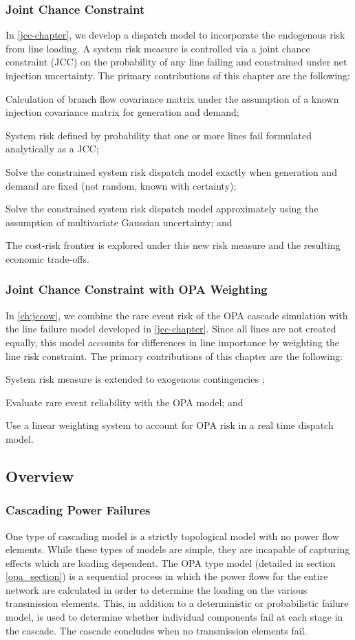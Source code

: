\subsubsection{Joint Chance Constraint}
In \cref{jcc-chapter}, we develop a dispatch model to incorporate the endogenous risk from line loading.  A system risk measure is controlled via a joint chance constraint (JCC) on the probability of any line failing and constrained under net injection uncertainty.  The primary contributions of this chapter are the following:
\bi
\item Calculation of branch flow covariance matrix under the assumption of a known injection covariance matrix for generation and demand;
\item System risk defined by probability that one or more lines fail formulated analytically as a JCC;
\item Solve the constrained system risk dispatch model exactly when generation and demand are fixed (not random, known with certainty);
\item Solve the constrained system risk dispatch model approximately using the assumption of multivariate Gaussian uncertainty; and
\item The cost-risk frontier is explored under this new risk measure and the resulting economic trade-offs.
\ei

\subsubsection{Joint Chance Constraint with OPA Weighting}
In \cref{ch:jccow}, we combine the rare event risk of the OPA cascade simulation with the line failure model developed in \cref{jcc-chapter}.  Since all lines are not created equally, this model accounts for differences in line importance by weighting the line risk constraint.  The primary contributions of this chapter are the following:
\bi
\item System risk measure is extended to exogenous contingencies ;
\item Evaluate rare event reliability with the OPA model; and
\item Use a linear weighting system to account for OPA risk in a real time dispatch model.
\ei

\subsection{Overview}
\subsubsection{Cascading Power Failures}
One type of cascading model is a strictly topological model with no power flow elements.  While these types of models are simple, they are incapable of capturing effects which are loading dependent. The OPA type model (detailed in section \ref{opa_section}) is a sequential process in which the power flows for the entire network are calculated in order to determine the loading on the various transmission elements.  This, in addition to a deterministic or probabilistic failure model, is used to determine whether individual components fail at each stage in the cascade.  The cascade concludes when no transmission elements fail.


